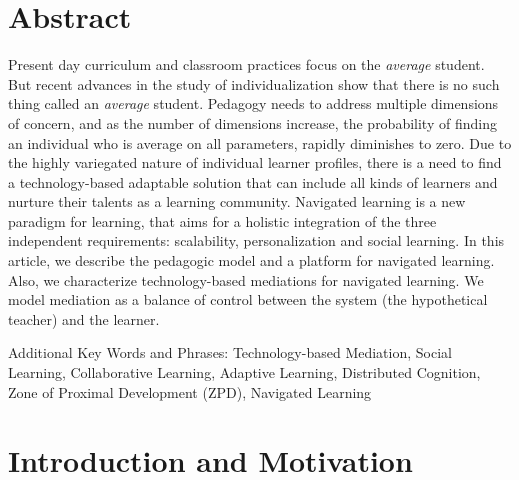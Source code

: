 \begin{multicols}{2}

\section*{Abstract} 
Present day curriculum and classroom practices focus on the \textit{average} student. But recent advances in the study of individualization show that there is no such thing called an \textit{average} student. Pedagogy needs to address multiple dimensions of concern, and as the number of dimensions increase, the probability of finding an individual who is average on all parameters, rapidly diminishes to zero. Due to the highly variegated nature of individual learner profiles, there is a need to find a technology-based adaptable solution that can include all kinds of learners and nurture their talents as a learning community. Navigated learning is a new paradigm for learning, that aims for a holistic integration of the three independent requirements: scalability, personalization and social learning. In this article, we describe the pedagogic model and a platform for navigated learning. Also, we characterize technology-based mediations for navigated learning. We model mediation as a balance of control between the system (the hypothetical teacher) and the learner.

 Additional Key Words and Phrases: Technology-based Mediation, Social Learning, Collaborative Learning, Adaptive Learning, Distributed Cognition, Zone of Proximal Development (ZPD), Navigated Learning 

\section{Introduction and Motivation}


\end{multicols}
